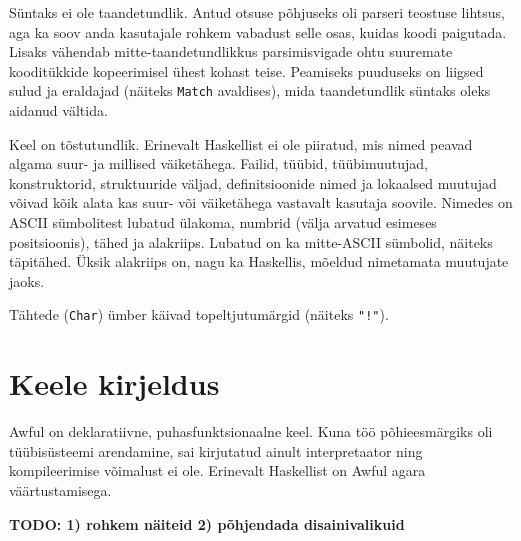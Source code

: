 \documentclass[12pt]{article}
\newcommand\peatykk[1]{
  \clearpage
  \section{#1}}
\newcommand\markus[1]{\textcolor{roheline}{\textbf{#1}}}
\begin{document}
\begin{comment}
  data Brnch_0 = Brnch_0 Name [Name] Name [(Name, Type_0)] deriving Show
  data Data_br_0 = Branching_data_0 Name [Kind_0] [(Name, Kind_0)] [Brnch_0] | Plain_data_0 [(Name, Kind_0)] Data_branch_0
  data Data_branch_0 = Algebraic_data_0 [Form_0]
  data Def_0 =
    Basic_def_0 Name [(Name, Kind_0)] [Constraint_0] [(Pattern_1, Type_0)] Type_0 Expression_0 |
    Instance_def_0 Location_0 Name Name [Kind_0] [Pattern_1] [Constraint_0] [(Name, ([Pattern_1], Expression_0))]
  data Expression_branch_0 =
    Application_expression_0 Expression_0 Expression_0
  data Match_Algebraic_0 = Match_Algebraic_0 Name [Pattern_1] Expression_0 deriving Show
  data Match_char_0 = Match_char_0 Char Expression_0 deriving Show
  data Match_Int_0 = Match_Int_0 Integer Expression_0 deriving Show
  data Matches_0 =
    Matches_Algebraic_0 [Match_Algebraic_0] (Maybe (Location_0, Expression_0)) |
    Matches_char_0 [Match_char_0] Expression_0 |
    Matches_Int_0 [Match_Int_0] Expression_0
      deriving Show
\end{comment}
    Süntaks ei ole taandetundlik. Antud otsuse põhjuseks oli parseri teostuse lihtsus, aga ka soov anda kasutajale rohkem vabadust selle osas, kuidas koodi paigutada. Lisaks vähendab mitte-taandetundlikkus parsimisvigade ohtu suuremate kooditükkide kopeerimisel ühest kohast teise. Peamiseks puuduseks on liigsed sulud ja eraldajad (näiteks \verb!Match! avaldises), mida taandetundlik süntaks oleks aidanud vältida.

    Keel on tõstutundlik. Erinevalt Haskellist ei ole piiratud, mis nimed peavad algama suur- ja millised väiketähega. Failid, tüübid, tüübimuutujad, konstruktorid, struktuuride väljad, definitsioonide nimed ja lokaalsed muutujad võivad kõik alata kas suur- või väiketähega vastavalt kasutaja soovile. Nimedes on ASCII sümbolitest lubatud ülakoma, numbrid (välja arvatud esimeses positsioonis), tähed ja alakriips. Lubatud on ka mitte-ASCII sümbolid, näiteks täpitähed. Üksik alakriips on, nagu ka Haskellis, mõeldud nimetamata muutujate jaoks.

    Tähtede (\verb!Char!) ümber käivad topeltjutumärgid (näiteks \verb#"!"#).
  \peatykk{Keele kirjeldus}\label{manual}
    Awful on deklaratiivne, puhasfunktsionaalne keel. Kuna töö põhieesmärgiks oli tüübisüsteemi arendamine, sai kirjutatud ainult interpretaator ning kompileerimise võimalust ei ole. Erinevalt Haskellist on Awful agara väärtustamisega.

    \markus{TODO: 1) rohkem näiteid 2) põhjendada disainivalikuid}
\end{document}
